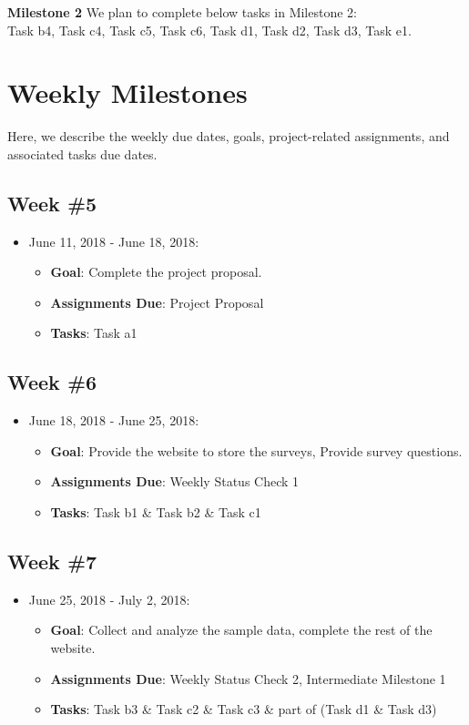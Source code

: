 \documentclass{sigchi}
\begin{document}
\textbf{Milestone 2}\newline
We plan to complete below tasks in Milestone 2:\\
Task b4, Task c4, Task c5, Task c6, Task d1, Task d2, Task d3, Task e1.

\section{Weekly Milestones}
Here, we describe the weekly due dates, goals, project-related assignments, and associated tasks due dates.

\subsection{Week \#5}
\begin{itemize}
 	\item June 11, 2018 - June 18, 2018:
	\begin{itemize}
 		\item \textbf{Goal}: Complete the project proposal.
 		\item \textbf{Assignments Due}: Project Proposal
 		\item \textbf{Tasks}: Task a1
 	\end{itemize} 
 \end{itemize}


\subsection{Week \#6}
\begin{itemize}
 	\item June 18, 2018 - June 25, 2018:
	\begin{itemize}
 		\item \textbf{Goal}: Provide the website to store the surveys, Provide survey questions.
 		\item \textbf{Assignments Due}: Weekly Status Check 1
 		\item \textbf{Tasks}: Task b1 \& Task b2 \& Task c1
	\end{itemize}
 \end{itemize} 
 
 \subsection{Week \#7}
\begin{itemize}
 	\item June 25, 2018 - July 2, 2018:
	\begin{itemize}
 		\item \textbf{Goal}: Collect and analyze the sample data, complete the rest of the website.
 		\item \textbf{Assignments Due}: Weekly Status Check 2, Intermediate Milestone 1
 		\item \textbf{Tasks}: Task b3 \& Task c2 \& Task c3 \& part of (Task d1 \& Task d3)
 	\end{itemize} 
\end{itemize}
 
\end{document}
